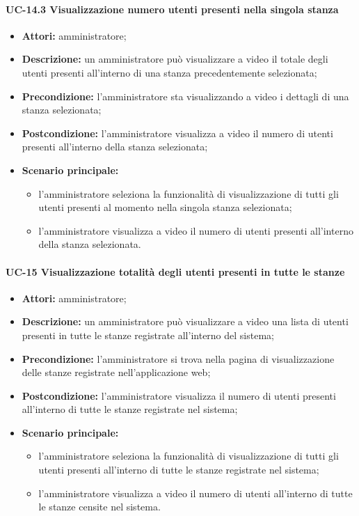 \paragraph{UC-14.3 Visualizzazione numero utenti presenti nella singola stanza}
\begin{itemize}
    \item \textbf{Attori:} amministratore;
    \item \textbf{Descrizione:} un amministratore pu\`{o} visualizzare a video il totale degli utenti presenti all'interno di una stanza precedentemente selezionata;
    \item \textbf{Precondizione:} l'amministratore sta visualizzando a video i dettagli di una stanza selezionata;
    \item \textbf{Postcondizione:} l'amministratore visualizza a video il numero di utenti presenti all'interno della stanza selezionata;
    \item \textbf{Scenario principale:}
    \begin{itemize}
        \item l'amministratore seleziona la funzionalità di visualizzazione di tutti gli utenti presenti al momento nella singola stanza selezionata;
        \item l'amministratore visualizza a video il numero di utenti presenti all'interno della stanza selezionata.
    \end{itemize}
\end{itemize}


\paragraph{UC-15 Visualizzazione totalità degli utenti presenti in tutte le stanze}
\begin{itemize}
    \item \textbf{Attori:} amministratore;
    \item \textbf{Descrizione:} un amministratore pu\`{o} visualizzare a video una lista di utenti presenti in tutte le stanze registrate all'interno del sistema;
    \item \textbf{Precondizione:} l'amministratore si trova nella pagina di visualizzazione delle stanze registrate nell'applicazione web;
    \item \textbf{Postcondizione:} l'amministratore visualizza il numero di utenti presenti all'interno di tutte le stanze registrate nel sistema;
    \item \textbf{Scenario principale:}
    \begin{itemize}
        \item l'amministratore seleziona la funzionalità di visualizzazione di tutti gli utenti presenti all'interno di tutte le stanze registrate nel sistema;
        \item l'amministratore visualizza a video il numero di utenti all'interno di tutte le stanze censite nel sistema.
    \end{itemize}
\end{itemize}

